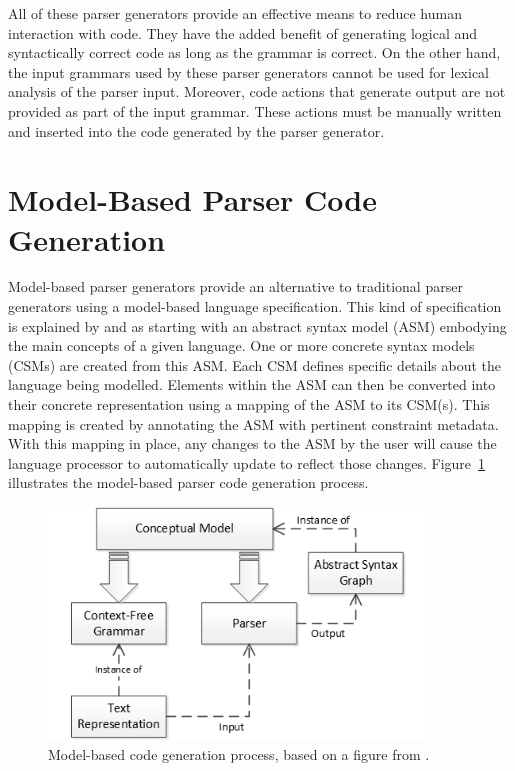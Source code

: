\indent
All of these parser generators provide an effective means to reduce human interaction with code.  They have the added benefit of generating logical and syntactically correct code as long as the grammar is correct.  On the other hand, the input grammars used by these parser generators cannot be used for lexical analysis of the parser input.  Moreover, code actions that generate output are not provided as part of the input grammar.  These actions must be manually written and inserted into the code generated by the parser generator.

\section{Model-Based Parser Code Generation}

\indent
Model-based parser generators provide an alternative to traditional parser generators using a model-based language specification.  This kind of specification is explained by \cite{quesada_01} and \cite{quesada_02} as starting with an abstract syntax model (ASM) embodying the main concepts of a given language.  One or more concrete syntax models (CSMs) are created from this ASM.  Each CSM defines specific details about the language being modelled.  Elements within the ASM can then be converted into their concrete representation using a mapping of the ASM to its CSM(s).  This mapping is created by annotating the ASM with pertinent constraint metadata.  With this mapping in place, any changes to the ASM by the user will cause the language processor to automatically update to reflect those changes.  Figure~\ref{fig:ModelBasedCodeGenProcess} illustrates the model-based parser code generation process.

\begin{figure}[h!]
\centering
\includegraphics[width=0.9\textwidth]{figures/ModelBasedCodeGenProcess.png}
\caption[Model-based code generation process.]{Model-based code generation process, based on a figure from \cite{quesada_02}.}
\label{fig:ModelBasedCodeGenProcess}
\end{figure}

